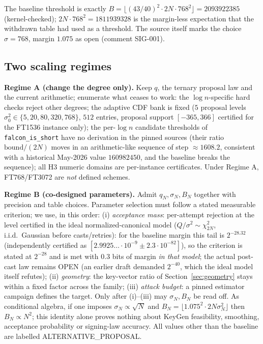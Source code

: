\documentclass[11pt,a4paper]{article}
\theoremstyle{remark}
\newcommand{\OPEN}{\textsf{OPEN}}
\newcommand{\ALTP}{\textsf{ALTERNATIVE\_PROPOSAL}}
\begin{document}
The baseline threshold is exactly
$B=\lfloor (43/40)^2\cdot 2N\cdot 768^2\rfloor = 2093922385$ (kernel-checked);
$2N\cdot768^2=1811939328$ is the margin-less expectation that the withdrawn
table had used as a threshold. The source itself marks the choice
$\sigma=768$, margin $1.075$ as open (comment SIG-001).

\subsection{Two scaling regimes}
\textbf{Regime A (change the degree only).} Keep $q$, the ternary proposal
law and the current arithmetic; enumerate what ceases to work: the
$\log n$-specific hard checks reject other degrees; the adaptive CDF bank is
fixed ($5$ proposal levels $\sigma_0^2\in\{5,20,80,320,768\}$, $512$ entries,
proposal support $[-365,366]$ certified for the FT1536 instance only); the
per-$\log n$ candidate thresholds of \texttt{falcon\_is\_short} have no
derivation in the pinned sources (their ratio $\mathrm{bound}/(2N)$ moves in
an arithmetic-like sequence of step $\approx 1608.2$, consistent with a
historical May-2026 value $160982450$, and the baseline breaks the
sequence); all H3 numeric domains are per-instance certificates. Under
Regime A, FT768/FT3072 are \emph{not} defined schemes.

\textbf{Regime B (co-designed parameters).} Admit $q_N,\sigma_N,B_N$
together with precision and table choices. Parameter selection must follow a
stated measurable criterion; we use, in this order:
(i) \emph{acceptance mass}: per-attempt rejection at the level certified in
the ideal normalized-canonical model ($Q/\sigma^2\sim\chi^2_{2N}$, i.i.d.\
Gaussian before casts/retries): for the baseline margin this tail is
$2^{-28.32}$ (independently certified as
$[2.9925\ldots\!\cdot\!10^{-9}\pm2.3\!\cdot\!10^{-82}]$), so the criterion
is stated at $2^{-28}$ and is met with $0.3$ bits of margin \emph{in that
model}; the actual post-cast law remains \OPEN{} (an earlier draft demanded
$2^{-40}$, which the ideal model itself refutes);
(ii) \emph{geometry}: the key-vector ratio of
Section~\ref{sec:geometry} stays within a fixed factor across the family;
(iii) \emph{attack budget}: a pinned estimator campaign defines the target.
Only after (i)--(iii) may $\sigma_N,B_N$ be read off. As conditional algebra,
if one imposes $\sigma_N\propto\sqrt N$ and
$B_N=\lfloor 1.075^2\cdot 2N\sigma_N^2\rfloor$ then $B_N\propto N^2$; this
identity alone proves nothing about KeyGen feasibility, smoothing, acceptance
probability or signing-law accuracy. All values other than the baseline are
labelled \ALTP.
\end{document}
